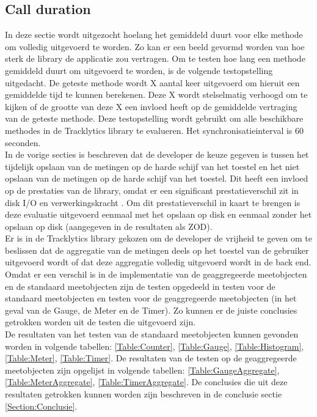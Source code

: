 \subsection{Call duration}
In deze sectie wordt uitgezocht hoelang het gemiddeld duurt voor elke methode om volledig uitgevoerd te worden. Zo kan er een beeld gevormd worden van hoe sterk de library de applicatie zou vertragen. Om te testen hoe lang een methode gemiddeld duurt om uitgevoerd te worden, is de volgende testopstelling uitgedacht. De geteste methode wordt X aantal keer uitgevoerd om hieruit een gemiddelde tijd te kunnen berekenen. Deze X wordt stelselmatig verhoogd om te kijken of de grootte van deze X een invloed heeft op de gemiddelde vertraging van de geteste methode. Deze testopstelling wordt gebruikt om alle beschikbare methodes in de Tracklytics library te evalueren. Het synchronisatieinterval is 60 seconden. \\

In de vorige secties is beschreven dat de developer de keuze gegeven is tussen het tijdelijk opslaan van de metingen op de harde schijf van het toestel en het niet opslaan van de metingen op de harde schijf van het toestel. Dit heeft een invloed op de prestaties van de library, omdat er een significant prestatieverschil zit in disk I/O en verwerkingskracht \cite{diskIO}. Om dit prestatieverschil in kaart te brengen is deze evaluatie uitgevoerd eenmaal met het opslaan op disk en eenmaal zonder het opslaan op disk (aangegeven in de resultaten als ZOD).\\

Er is in de Tracklytics library gekozen om de developer de vrijheid te geven om te beslissen dat de aggregatie van de metingen deels op het toestel van de gebruiker uitgevoerd wordt of dat deze aggregatie volledig uitgevoerd wordt in de back end. Omdat er een verschil is in de implementatie van de geaggregeerde meetobjecten en de standaard meetobjecten zijn de testen opgedeeld in testen voor de standaard meetobjecten en testen voor de geaggregeerde meetobjecten (in het geval van de Gauge, de Meter en de Timer). Zo kunnen er de juiste conclusies getrokken worden uit de testen die uitgevoerd zijn.\\


De resultaten van het testen van de standaard meetobjecten kunnen gevonden worden in volgende tabellen: \ref{Table:Counter}, \ref{Table:Gauge}, \ref{Table:Histogram}, \ref{Table:Meter}, \ref{Table:Timer}. De resultaten van de testen op de geaggregeerde meetobjecten zijn opgelijst in volgende tabellen: \ref{Table:GaugeAggregate}, \ref{Table:MeterAggregate}, \ref{Table:TimerAggregate}. De conclusies die uit deze resultaten getrokken kunnen worden zijn beschreven in de conclusie sectie \ref{Section:Conclusie}. \\


